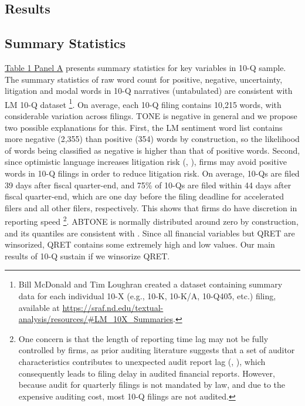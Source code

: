 \documentclass[a4paper]{article}
\begin{document}
\begin{spacing}{2}
\section{Results}
\subsection{Summary Statistics}
\hyperref[T1PA]{Table 1 Panel A} presents summary statistics for key variables in 10-Q sample. The summary statistics of raw word count for positive, negative, uncertainty, litigation and modal words in 10-Q narratives (untabulated) are consistent with LM 10-Q dataset \footnote{Bill McDonald and Tim Loughran created a dataset containing summary data for each individual 10-X (e.g., 10-K, 10-K/A, 10-Q405, etc.) filing, available at \url{https://sraf.nd.edu/textual-analysis/resources/\#LM_10X_Summaries}.}. On average, each 10-Q filing contains 10,215 words, with considerable variation across filings. TONE is negative in general and we propose two possible explanations for this. First, the LM sentiment word list contains more negative (2,355) than positive (354) words by construction, so the likelihood of words being classified as negative is higher than that of positive words. Second, since optimistic language increases litigation risk (\cite{rogersDisclosureToneShareholder2011}, \cite{cazierWhenAreFirms2020}), firms may avoid positive words in 10-Q filings in order to reduce litigation risk. On average, 10-Qs are filed 39 days after fiscal quarter-end, and 75\% of 10-Qs are filed within 44 days after fiscal quarter-end, which are one day before the filing deadline for accelerated filers and all other filers, respectively. This shows that firms do have discretion in reporting speed \footnote{One concern is that the length of reporting time lag may not be fully controlled by firms, as prior auditing literature suggests that a set of auditor characteristics contributes to unexpected audit report lag (\cite{knechelAdditionalEvidenceAudit2001}, \cite{bamberAuditStructureOther1993}), which consequently leads to filing delay in audited financial reports. However, because audit for quarterly filings is not mandated by law, and due to the expensive auditing cost, most 10-Q filings are not audited.}. ABTONE is normally distributed around zero by construction, and its quantiles are consistent with \cite{huangToneManagement2014}. Since all financial variables but QRET are winsorized, QRET contains some extremely high and low values. Our main results of 10-Q sustain if we winsorize QRET.


\end{spacing}
\end{document}
